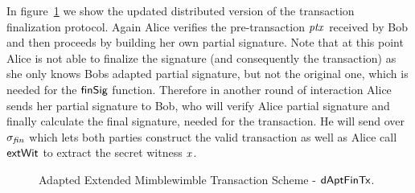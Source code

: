 In figure~\ref{fig:inst-apt-mw-tx-fin} we show the updated distributed version of the transaction finalization protocol. Again Alice verifies the pre-transaction $\mathit{ptx}$ received by Bob and then proceeds by building
her own partial signature. Note that at this point Alice is not able to finalize the signature (and consequently the transaction) as she only knows Bobs adapted partial signature, but not the original one, which is needed
for the $\mathsf{finSig}$ function. Therefore in another round of interaction Alice sends her partial signature to Bob, who will verify Alice partial signature and finally calculate the final signature, needed for the transaction.
He will send over $\sigma_{\mathit{fin}}$ which lets both parties construct the valid transaction as well as Alice call $\mathsf{extWit}$ to extract the secret witness $\mathit{x}$.

\begin{landscape}
\begin{figure}
    \caption{Adapted Extended Mimblewimble Transaction Scheme - $\mathsf{dAptFinTx}$. \label{fig:inst-apt-mw-tx-fin}}
\end{figure}
\end{landscape}

